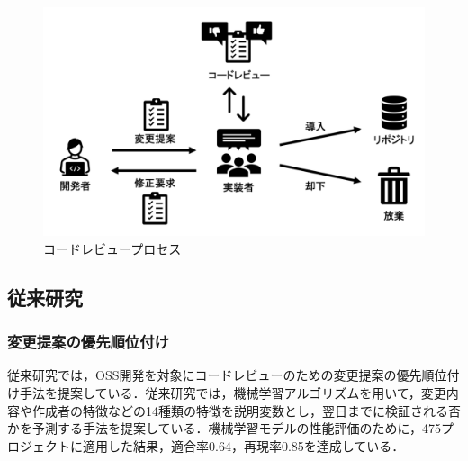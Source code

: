 \documentclass[T,J]{fose} %
\begin{document}

\begin{figure}[t]
\begin{center}
\includegraphics[width=1.0\linewidth]{Uenaka_fig/code_review_process.pdf}
\caption{コードレビュープロセス}
\label{fig:codereviewprocess}
\end{center}
\end{figure}

\subsection{従来研究}

\subsubsection{変更提案の優先順位付け}
従来研究では，OSS開発を対象にコードレビューのための変更提案の優先順位付け手法を提案している．従来研究では，機械学習アルゴリズムを用いて，変更内容や作成者の特徴などの14種類の特徴を説明変数とし，翌日までに検証される否かを予測する手法を提案している\cite{prioritizer}．機械学習モデルの性能評価のために，475プロジェクトに適用した結果，適合率0.64，再現率0.85を達成している．
\end{document}
